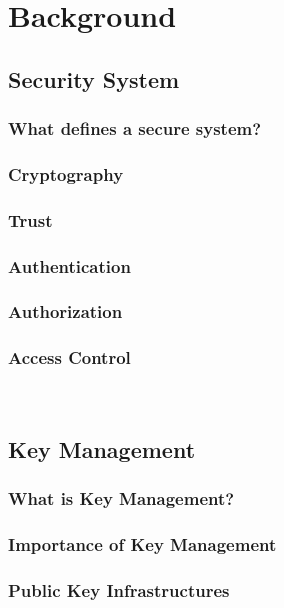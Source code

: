 \chapter{Background}\label{C:background}

\section{Security System}
	
	\subsection{What defines a secure system?}

	\subsection{Cryptography}

	\subsection{Trust}

	\subsection{Authentication}

	\subsection{Authorization}

	\subsection{Access Control}\

\section{Key Management}
	\subsection{What is Key Management?}

	\subsection{Importance of Key Management}

	\subsection{Public Key Infrastructures}

